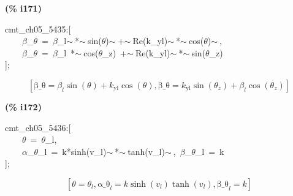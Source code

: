 \documentclass[fleqn]{article}
\begin{document}
\noindent
\begin{minipage}[t]{4.000000em}\color{red}\bfseries
(\% i171)	
\end{minipage}
\begin{minipage}[t]{\textwidth}\color{blue}
cmt\_ch05\_5435:[\\
\ \ \ \ \ensuremath{\beta}\_\ensuremath{\theta}\ =\ \ensuremath{\beta}\_l\ensuremath{\sim\ }*\ensuremath{\sim\ }sin(\ensuremath{\theta})\ensuremath{\sim\ }+\ensuremath{\sim\ }Re(k\_yl)\ensuremath{\sim\ }*\ensuremath{\sim\ }cos(\ensuremath{\theta})\ensuremath{\sim\ },\\
\ \ \ \ \ensuremath{\beta}\_\ensuremath{\theta}\ =\ \ensuremath{\beta}\_l\ *\ensuremath{\sim\ }cos(\ensuremath{\theta}\_z)\ +\ensuremath{\sim\ }Re(k\_yl)\ensuremath{\sim\ }*\ensuremath{\sim\ }sin(\ensuremath{\theta}\_z)\\
];
\end{minipage}
\[\displaystyle \tag{\% o171} 
\left[ \ensuremath{\mathrm{\beta \_ \theta }}={{\beta }_l} \sin{\left( \theta \right) }+{k_{\ensuremath{\mathrm{yl}}}} \cos{\left( \theta \right) }\operatorname{,}\ensuremath{\mathrm{\beta \_ \theta }}={k_{\ensuremath{\mathrm{yl}}}} \sin{\left( {{\theta }_z}\right) }+{{\beta }_l} \cos{\left( {{\theta }_z}\right) }\right] \mbox{}
\]


\noindent
\begin{minipage}[t]{4.000000em}\color{red}\bfseries
(\% i172)	
\end{minipage}
\begin{minipage}[t]{\textwidth}\color{blue}
cmt\_ch05\_5436:[\\
\ \ \ \ \ensuremath{\theta}\ =\ \ensuremath{\theta}\_l,\\
\ \ \ \ \ensuremath{\alpha}\_\ensuremath{\theta}\_l\ =\ k*sinh(v\_l)\ensuremath{\sim\ }*\ensuremath{\sim\ }tanh(v\_l)\ensuremath{\sim\ },\ \ensuremath{\beta}\_\ensuremath{\theta}\_l\ =\ k\\
];
\end{minipage}
\[\displaystyle \tag{\% o172} 
\left[ \theta ={{\theta }_l}\operatorname{,}{{\ensuremath{\mathrm{\alpha \_ \theta }}}_l}=k \sinh{\left( {v_l}\right) } \operatorname{tanh}\left( {v_l}\right) \operatorname{,}{{\ensuremath{\mathrm{\beta \_ \theta }}}_l}=k\right] \mbox{}
\]
\end{document}
